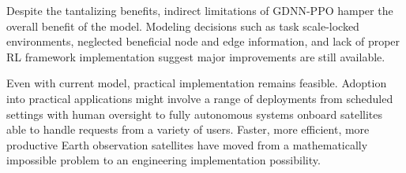 \documentclass[conf]{new-aiaa}
\begin{document}
Despite the tantalizing benefits, indirect limitations of GDNN-PPO hamper the overall benefit of the model.
Modeling decisions such as task scale-locked environments, neglected beneficial node and edge information, and lack of proper RL framework implementation suggest major improvements are still available.

Even with current model, practical implementation remains feasible.
Adoption into practical applications might involve a range of deployments from scheduled settings with human oversight to fully autonomous systems onboard satellites able to handle requests from a variety of users.
Faster, more efficient, more productive Earth observation satellites have moved from a mathematically impossible problem to an engineering implementation possibility.


\end{document}
